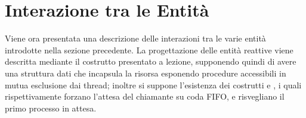 \section{Interazione tra le Entità}

Viene ora presentata una descrizione delle interazioni tra le varie entità introdotte nella sezione precedente. La progettazione delle entità reattive viene descritta mediante il costrutto  presentato a lezione, supponendo quindi di avere una struttura dati che incapsula la risorsa esponendo procedure accessibili in mutua esclusione dai thread; inoltre si suppone l'esistenza dei costrutti  e , i quali rispettivamente forzano l'attesa del chiamante su coda FIFO, e risvegliano il primo processo in attesa.






